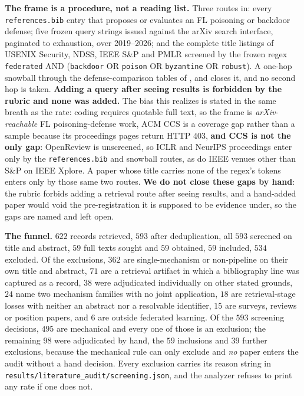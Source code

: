 \documentclass{article}
\begin{document}
\textbf{The frame is a procedure, not a reading list.} Three routes in: every \texttt{references.bib} entry that proposes or evaluates an FL poisoning or backdoor defense; five frozen query strings issued against the arXiv search interface, paginated to exhaustion, over 2019--2026; and the complete title listings of USENIX Security, NDSS, IEEE S\&P and PMLR screened by the frozen regex \texttt{federated} AND (\texttt{backdoor} OR \texttt{poison} OR \texttt{byzantine} OR \texttt{robust}). A one-hop snowball through the defense-comparison tables of \citet{nguyen2022flame}, \citet{rieger2022deepsight} and \citet{fenaux2025hammer} closes it, and no second hop is taken. \textbf{Adding a query after seeing results is forbidden by the rubric and none was added.} The bias this realizes is stated in the same breath as the rate: coding requires quotable full text, so the frame is \emph{arXiv-reachable} FL poisoning-defense work, ACM CCS is a coverage gap rather than a sample because its proceedings pages return HTTP 403, \textbf{and CCS is not the only gap}: OpenReview is unscreened, so ICLR and NeurIPS proceedings enter only by the \texttt{references.bib} and snowball routes, as do IEEE venues other than S\&P on IEEE Xplore. A paper whose title carries none of the regex's tokens enters only by those same two routes. \textbf{We do not close these gaps by hand}: the rubric forbids adding a retrieval route after seeing results, and a hand-added paper would void the pre-registration it is supposed to be evidence under, so the gaps are named and left open.

\textbf{The funnel.} $622$ records retrieved, $593$ after deduplication, all $593$ screened on title and abstract, $59$ full texts sought and $59$ obtained, $59$ included, $534$ excluded. Of the exclusions, $362$ are single-mechanism or non-pipeline on their own title and abstract, $71$ are a retrieval artifact in which a bibliography line was captured as a record, $38$ were adjudicated individually on other stated grounds, $24$ name two mechanism families with no joint application, $18$ are retrieval-stage losses with neither an abstract nor a resolvable identifier, $15$ are surveys, reviews or position papers, and $6$ are outside federated learning. Of the $593$ screening decisions, $495$ are mechanical and every one of those is an exclusion; the remaining $98$ were adjudicated by hand, the $59$ inclusions and $39$ further exclusions, because the mechanical rule can only exclude and \emph{no} paper enters the audit without a hand decision. Every exclusion carries its reason string in \texttt{results/\allowbreak literature\_audit/\allowbreak screening.json}, and the analyzer refuses to print any rate if one does not.
\end{document}
